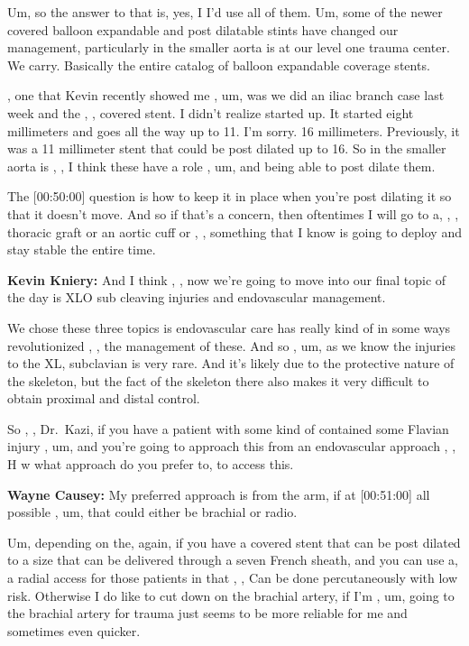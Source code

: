 \documentclass[
]{book}
\begin{document}
Um, so the answer to that is, yes, I I'd use all of them. Um, some of
the newer covered balloon expandable and post dilatable stints have
changed our management, particularly in the smaller aorta is at our
level one trauma center. We carry. Basically the entire catalog of
balloon expandable coverage stents.

, one that Kevin recently showed me , um, was we did an iliac branch
case last week and the , , covered stent. I didn't realize started up.
It started eight millimeters and goes all the way up to 11. I'm sorry.
16 millimeters. Previously, it was a 11 millimeter stent that could be
post dilated up to 16. So in the smaller aorta is , , I think these have
a role , um, and being able to post dilate them.

The {[}00:50:00{]} question is how to keep it in place when you're post
dilating it so that it doesn't move. And so if that's a concern, then
oftentimes I will go to a, , , thoracic graft or an aortic cuff or , ,
something that I know is going to deploy and stay stable the entire
time.

\textbf{Kevin Kniery:} And I think , , now we're going to move into our final
topic of the day is XLO sub cleaving injuries and endovascular
management.

We chose these three topics is endovascular care has really kind of in
some ways revolutionized , , the management of these. And so , um, as we
know the injuries to the XL, subclavian is very rare. And it's likely
due to the protective nature of the skeleton, but the fact of the
skeleton there also makes it very difficult to obtain proximal and
distal control.

So , , Dr.~Kazi, if you have a patient with some kind of contained some
Flavian injury , um, and you're going to approach this from an
endovascular approach , , H w what approach do you prefer to, to access
this.

\textbf{Wayne Causey:} My preferred approach is from the arm, if at
{[}00:51:00{]} all possible , um, that could either be brachial or radio.

Um, depending on the, again, if you have a covered stent that can be
post dilated to a size that can be delivered through a seven French
sheath, and you can use a, a radial access for those patients in that ,
, Can be done percutaneously with low risk. Otherwise I do like to cut
down on the brachial artery, if I'm , um, going to the brachial artery
for trauma just seems to be more reliable for me and sometimes even
quicker.
\end{document}
